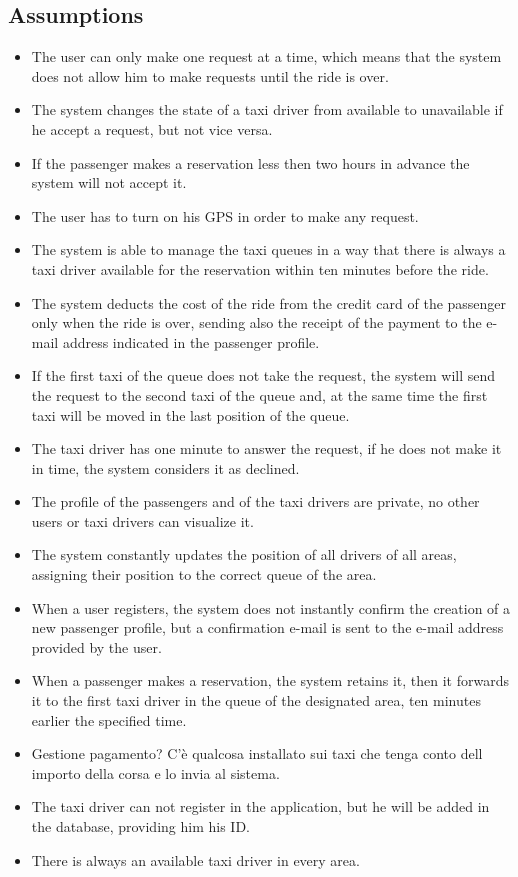 \documentclass[18pt,oneside,a4paper, titlepage]{article}
\begin{document}
		\subsection{Assumptions}
			\begin{itemize}
				\item The user can only make one request at a time, which means that the system does not allow him to make requests until the ride is over.
				\item The system changes the state of a taxi driver from available to unavailable if he accept a request, but not vice versa.
				\item If the passenger makes a reservation less then two hours in advance the system will not accept it.
				\item The user has to turn on his GPS in order to make any request.
				\item The system is able to manage the taxi queues in a way that there is always a taxi driver available for the reservation within ten minutes before the ride.
				\item The system deducts the cost of the ride from the credit card of the passenger only when the ride is over, sending also the receipt of the payment to the e-mail address indicated in the passenger profile.
				\item If the first taxi of the queue does not take the request, the system will send the request to the second taxi of the queue and, at the same time the first taxi will be moved in the last position of the queue.
				\item The taxi driver has one minute to answer the request, if he does not make it in time, the system considers it as declined.
				\item The profile of the passengers and of the taxi drivers are private, no other users or taxi drivers can visualize it.
				\item  The system constantly updates the position of all drivers of all areas, assigning their position to the correct queue of the area.
				\item When a user registers, the system does not instantly confirm the creation of a new passenger profile, but a confirmation e-mail is sent to the e-mail address provided by the user.
				\item When a passenger makes a reservation, the system retains it, then it forwards it to the first taxi driver in the queue of the designated area, ten minutes earlier the specified time.
				\item Gestione pagamento? C'è qualcosa installato sui taxi che tenga conto dell importo della corsa e lo invia al sistema.
				\item The taxi driver can not register in the application, but he will be added in the database, providing him his ID.
				\item There is always an available taxi driver in every area.
			\end{itemize}
			
\end{document}
